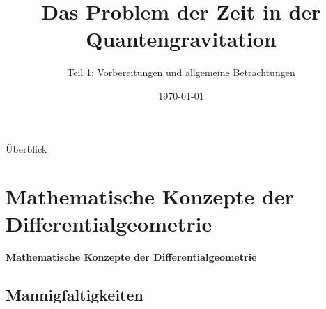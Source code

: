 \documentclass[mathserif]{beamer}
\title{\textbf{Das Problem der Zeit in der Quantengravitation}}
\author{\small {Teil 1: Vorbereitungen und allgemeine Betrachtungen}}
\institute{}
\date{\today}
\theoremstyle{definition}
\begin{document}
	\begin{frame}
		\titlepage
	\end{frame}

	\begin{frame}{Überblick}
		\tableofcontents
	\end{frame}

\section{Mathematische Konzepte der Differentialgeometrie}
\begin{frame}
\begin{center}
	\large \textbf{Mathematische Konzepte der Differentialgeometrie}
\end{center}
\end{frame}
\subsection{Mannigfaltigkeiten}
\end{document}
